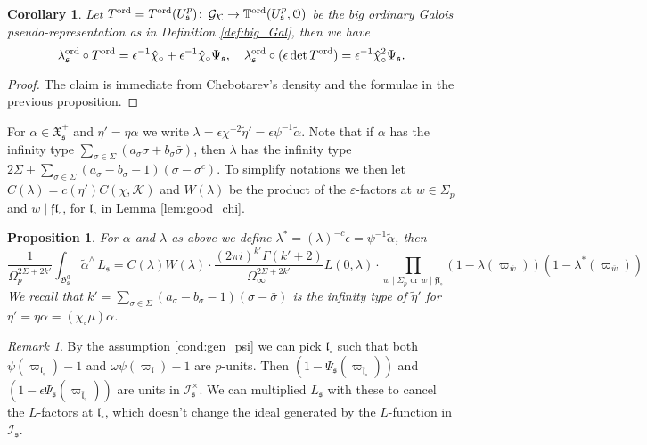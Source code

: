 \documentclass[leqno]{amsart}
\newtheorem{prop}[thm]{Proposition}
\newtheorem{cor}[thm]{Corollary}
\theoremstyle{definition}
\theoremstyle{remark}
\newtheorem{rem}[thm]{Remark}
\newcommand{\eo}{\EuScript{O}}
\DeclareMathOperator{\Gal}{\mathcal{G}}
\newcommand{\ff}{\mathfrak{f}}
\newcommand{\fl}{\mathfrak{l}}
\newcommand{\fs}{\mathfrak{s}}
\newcommand{\K}{{\mathcal{K}}} %
\newcommand{\bw}{\overline{w}}
\newcommand{\fG}{\mathfrak{G}}
\newcommand{\fX}{\mathfrak{X}}
\newcommand{\TT}{\mathbb{T}} %
\newcommand{\I}{\mathcal{I}} %
\newcommand{\ord}{\textnormal{ord}} %
\begin{document}
\begin{cor}
Let $T^{\ord}=T^{\ord}(U^p_\fs)
\colon\Gal_\K\to \TT^{\ord}(U^p_\fs,\eo)$
be the big ordinary Galois pseudo-representation
as in Definition \ref{def:big_Gal}, then we have
\begin{equation*}
    \lambda_{\fs}^{\ord}\circ T^{\ord}=
    \epsilon^{-1}\hat{\chi}_\circ+
    \epsilon^{-1}\hat{\chi}_\circ\Psi_\fs,\quad
    \lambda_{\fs}^{\ord}\circ (\epsilon \det T^{\ord})=
    \epsilon^{-1}\hat{\chi}^2_\circ\Psi_\fs.
\end{equation*}
\end{cor}
\begin{proof}
The claim is immediate from Chebotarev's density
and the formulae in the previous proposition.
\end{proof}


For $\alpha\in \fX_\fs^+$ and $\eta'=\eta\alpha$
we write $\lambda=
\epsilon \chi^{-2}\tilde{\eta}'=\epsilon\psi^{-1}\tilde{\alpha}$.
Note that if $\alpha$ has the infinity type 
$\sum_{\sigma\in\Sigma}(a_\sigma\sigma+b_\sigma\bar{\sigma})$,
then $\lambda$ has the infinity type
$2\Sigma+\sum_{\sigma\in\Sigma}(a_\sigma-b_\sigma-1)(\sigma-\sigma^c)$.
To simplify notations
we then let $C(\lambda)=c(\eta')C(\chi,\K)$
and $W(\lambda)$ be the product of the $\varepsilon$-factors
at $w\in\Sigma_p$ and $w\mid \ff\fl_\circ$,
for $\fl_\circ$ in Lemma \ref{lem:good_chi}.

\begin{prop}\label{prop:L-function_at_s}
For $\alpha$ and $\lambda$ as above we define 
$\lambda^*=(\lambda)^{-c}\epsilon=\psi^{-1}\tilde{\alpha}$, then
\begin{equation*}
	\frac{1}{\Omega_p^{2\Sigma+2k'}}
	\int_{\fG_{\fs}^a}\tilde{\alpha}^\wedge\,L_\fs=
	C(\lambda)W(\lambda)\cdot 
	\frac{(2\pi i)^{k'}\Gamma(k'+2)
	}{\Omega_\infty^{2\Sigma+2k'}}
    L(0,\lambda)\cdot
	\prod_{w\mid \Sigma_p\text{ or }w\mid\ff\fl_\circ}
	(1-\lambda(\varpi_{\bw}))
	(1-\lambda^*(\varpi_{\bw}))
\end{equation*}
We recall that 
$k'=\sum_{\sigma\in\Sigma}(a_\sigma-b_\sigma-1)(\sigma-\bar{\sigma})$
is the infinity type of $\tilde{\eta}'$
for $\eta'=\eta\alpha=(\chi_\circ\mu)\alpha$.
\end{prop}

\begin{rem}
By the assumption \eqref{cond:gen_psi}
we can pick $\fl_\circ$ 
such that both $\psi(\varpi_{\fl_\circ})-1$
and $\omega\psi(\varpi_{\fl})-1$ are $p$-units.
Then $(1-\Psi_\fs(\varpi_{\bar{\fl}_\circ}))$
and $(1-\epsilon\Psi_\fs(\varpi_{\bar{\fl}_\circ}))$
are units in $\I_\fs^\times$.
We can multiplied $L_\fs$ with these 
to cancel the $L$-factors at $\fl_\circ$,
which doesn't change the ideal generated by 
the $L$-function in $\I_\fs$.
\end{rem}
\end{document}
